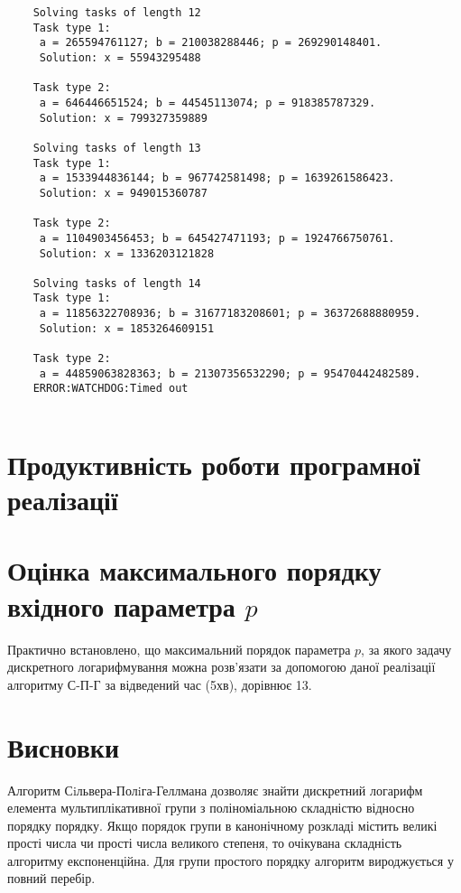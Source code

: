 \begin{lstlisting}
    Solving tasks of length 12
    Task type 1:
     a = 265594761127; b = 210038288446; p = 269290148401.
     Solution: x = 55943295488
    
    Task type 2:
     a = 646446651524; b = 44545113074; p = 918385787329.
     Solution: x = 799327359889
    
    Solving tasks of length 13
    Task type 1:
     a = 1533944836144; b = 967742581498; p = 1639261586423.
     Solution: x = 949015360787
    
    Task type 2:
     a = 1104903456453; b = 645427471193; p = 1924766750761.
     Solution: x = 1336203121828
    
    Solving tasks of length 14
    Task type 1:
     a = 11856322708936; b = 31677183208601; p = 36372688880959.
     Solution: x = 1853264609151
    
    Task type 2:
     a = 44859063828363; b = 21307356532290; p = 95470442482589.
    ERROR:WATCHDOG:Timed out
    
\end{lstlisting}

\section*{Продуктивність роботи програмної реалізації}





\section*{Оцінка максимального порядку вхідного параметра $p$}

Практично встановлено, що максимальний порядок параметра $p$, за якого задачу
дискретного логарифмування можна розв'язати за допомогою даної
реалізації алгоритму С-П-Г за відведений час (5хв), дорівнює 13.

\section*{Висновки}

Алгоритм Сiльвера-Полiга-Геллмана дозволяє знайти дискретний логарифм
елемента мультиплікативної групи з поліноміальною складністю відносно порядку
порядку. Якщо порядок групи в канонічному розкладі
містить великі прості числа чи прості числа великого степеня, то 
очікувана складність алгоритму експоненційна.
Для групи простого порядку алгоритм вироджується у повний перебір.



